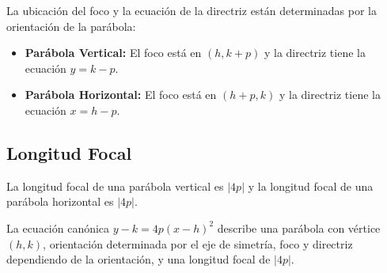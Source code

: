 \documentclass[]{book}
\providecommand{\tightlist}{%
  \setlength{\itemsep}{0pt}\setlength{\parskip}{0pt}}
\begin{document}
La ubicación del foco y la ecuación de la directriz están determinadas
por la orientación de la parábola:

\begin{itemize}
\tightlist
\item
  \textbf{Parábola Vertical:} El foco está en \((h, k + p)\) y la
  directriz tiene la ecuación \(y = k - p\).
\item
  \textbf{Parábola Horizontal:} El foco está en \((h + p, k)\) y la
  directriz tiene la ecuación \(x = h - p\).
\end{itemize}

\subsection{Longitud Focal}\label{longitud-focal}

La longitud focal de una parábola vertical es \(|4p|\) y la longitud
focal de una parábola horizontal es \(|4p|\).

La ecuación canónica \(y - k = 4p(x - h)^2\) describe una parábola con
vértice \((h, k)\), orientación determinada por el eje de simetría, foco
y directriz dependiendo de la orientación, y una longitud focal de
\(|4p|\).
\end{document}
